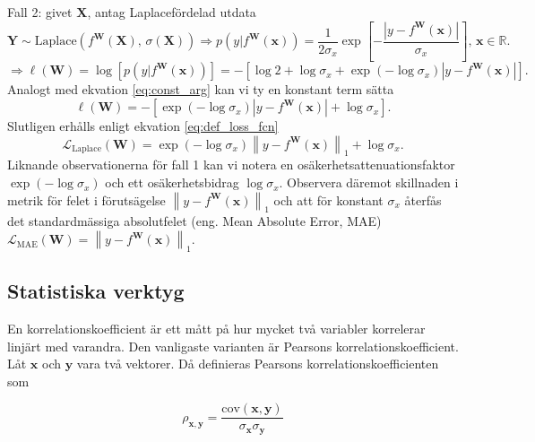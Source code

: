 Fall 2: givet $\mathbf{X}$, antag Laplacefördelad utdata
\begin{equation}
    \mathbf{Y} \sim \mathrm{Laplace}\left(f^\mathbf{W}(\mathbf{X}),\, \sigma(\mathbf{X}) \right) \Rightarrow p\left(y|f^\mathbf{W}(\mathbf{x})\right) = \frac{1}{2\sigma_x} \exp \left[-\frac{\left|y - f^\mathbf{W}(\mathbf{x})\right|}{\sigma_x} \right],\, \mathbf{x} \in \mathbb{R}.
\end{equation}
\begin{equation}
    \Rightarrow \ell(\mathbf{W}) = \log \left[p\left(y|f^\mathbf{W}(\mathbf{x})\right)\right] = -\left[\log 2 + \log \sigma_x + \exp{\left(-\log \sigma_x\right)}\left|y - f^\mathbf{W}(\mathbf{x})\right|\right].
\end{equation}
Analogt med ekvation \eqref{eq:const_arg} kan vi ty en konstant term sätta
\begin{equation}
    \ell(\mathbf{W}) = -\left[\exp{\left(-\log \sigma_x\right)}\left|y - f^\mathbf{W}(\mathbf{x})\right| + \log \sigma_x\right].
\end{equation}
Slutligen erhålls enligt ekvation \eqref{eq:def_loss_fcn}
\begin{equation}
    \mathcal{L}_\mathrm{Laplace}(\mathbf{W}) = \exp{\left(-\log \sigma_x\right)}\left\|y - f^\mathbf{W}(\mathbf{x})\right\|_1 + \log \sigma_x.
\end{equation}
Liknande observationerna för fall 1 kan vi notera en osäkerhetsattenuationsfaktor $ \exp{\left(-\log \sigma_x\right)}$ och ett osäkerhetsbidrag $\log \sigma_x$. Observera däremot skillnaden i metrik för felet i förutsägelse $\left\|y - f^\mathbf{W}(\mathbf{x})\right\|_1$ och att för konstant $\sigma_x$ återfås det standardmässiga absolutfelet (eng. Mean Absolute Error, MAE) $\mathcal{L}_\mathrm{MAE}(\mathbf{W}) = \left\|y - f^\mathbf{W}(\mathbf{x})\right\|_1$.

\subsection{Statistiska verktyg}
En korrelationskoefficient är ett mått på hur mycket två variabler korrelerar linjärt med varandra. Den vanligaste varianten är Pearsons korrelationskoefficient. Låt $\mathbf{x}$ och $\mathbf{y}$ vara två vektorer. Då definieras Pearsons korrelationskoefficienten som 

\begin{equation}
    \rho_{\mathbf{x},\mathbf{y}} = \frac{\text{cov}(\mathbf{x,y})}{\sigma_\mathbf{x}\sigma_\mathbf{y}}
\end{equation}


